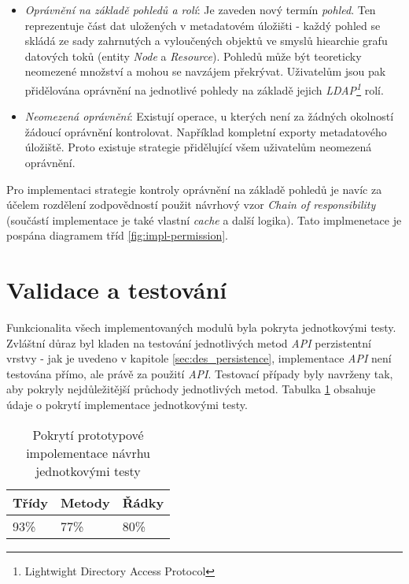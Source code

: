\begin{itemize}
   \item{\textit{Oprávnění na základě pohledů a rolí}}: Je zaveden nový termín \textit{pohled}. Ten reprezentuje část dat uložených v metadatovém úložišti - každý pohled se skládá ze sady zahrnutých a vyloučených objektů ve smyslů hiearchie grafu datových toků (entity \textit{Node} a \textit{Resource}). Pohledů může být teoreticky neomezené množství a mohou se navzájem překrývat. Uživatelům jsou pak přidělována oprávnění na jednotlivé pohledy na základě jejich \textit{LDAP\footnote{Lightwight Directory Access Protocol}} rolí.

   \item{\textit{Neomezená oprávnění}}: Existují operace, u kterých není za žádných okolností žádoucí oprávnění kontrolovat. Například kompletní exporty metadatového úložiště. Proto existuje strategie přidělující všem uživatelům neomezená oprávnění.
\end{itemize}

Pro implementaci strategie kontroly oprávnění na základě pohledů je navíc za účelem rozdělení zodpovědností použit návrhový vzor \textit{Chain of responsibility} (součástí implementace je také vlastní \textit{cache} a další logika). Tato implmenetace je pospána diagramem tříd \ref{fig:impl-permission}.


\section{Validace a testování}
Funkcionalita všech implementovaných modulů byla pokryta jednotkovými testy. Zvláštní důraz byl kladen na testování jednotlivých metod \textit{API} perzistentní vrstvy - jak je uvedeno v kapitole \ref{sec:des_persistence}, implementace \textit{API} není testována přímo, ale právě za použití \textit{API}. Testovací případy byly navrženy tak, aby pokryly nejdůležitější průchody jednotlivých metod. Tabulka \ref{tab:coverage} obsahuje údaje o pokrytí implementace jednotkovými testy.

\begin{table}[h!]
\begin{center}
\centering
\caption{Pokrytí prototypové impolementace návrhu jednotkovými testy}
\label{tab:coverage}
\begin{tabular}{|p{4cm}|p{4cm}|p{4cm}|}
	\hline
    Třídy & Metody & Řádky \\ \hline
	 93\% &	77\% &	80\% \\ \hline
 \end{tabular}
 \end{center}
 \end{table}

